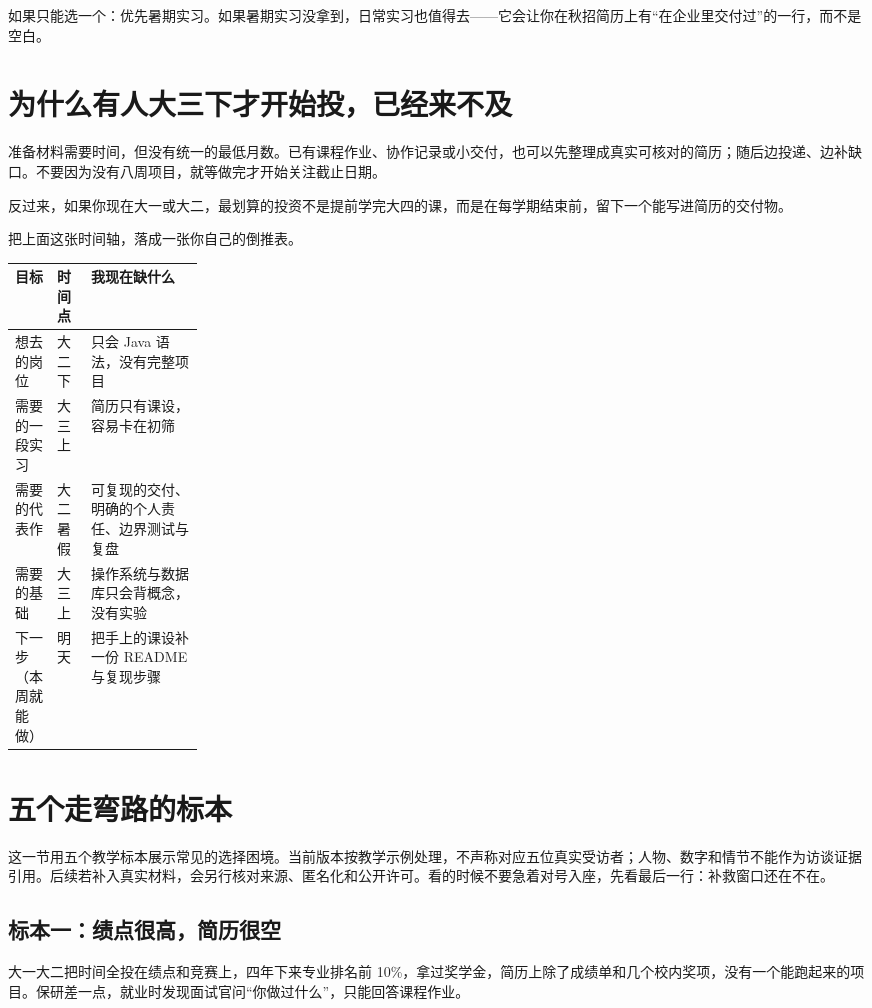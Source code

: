 \documentclass[UTF8,zihao=5,openany]{ctexbook}
\begin{document}
如果只能选一个：优先暑期实习。如果暑期实习没拿到，日常实习也值得去——它会让你在秋招简历上有“在企业里交付过”的一行，而不是空白。

\section{为什么有人大三下才开始投，已经来不及}
准备材料需要时间，但没有统一的最低月数。已有课程作业、协作记录或小交付，也可以先整理成真实可核对的简历；随后边投递、边补缺口。不要因为没有八周项目，就等做完才开始关注截止日期。

反过来，如果你现在大一或大二，最划算的投资不是提前学完大四的课，而是在每学期结束前，留下一个能写进简历的交付物。

把上面这张时间轴，落成一张你自己的倒推表。
\begin{toolbox}
\begin{center}\small
\begin{tabularx}{0.92\linewidth}{p{0.22\linewidth}YY}
\toprule
目标 & 时间点 & 我现在缺什么 \\
\midrule
想去的岗位 & 大二下 & 只会 Java 语法，没有完整项目 \\
需要的一段实习 & 大三上 & 简历只有课设，容易卡在初筛 \\
需要的代表作 & 大二暑假 & 可复现的交付、明确的个人责任、边界测试与复盘 \\
需要的基础 & 大三上 & 操作系统与数据库只会背概念，没有实验 \\
下一步（本周就能做） & 明天 & 把手上的课设补一份 README 与复现步骤 \\
\bottomrule
\end{tabularx}
\end{center}
\end{toolbox}


\section{五个走弯路的标本}
这一节用五个教学标本展示常见的选择困境。当前版本按教学示例处理，不声称对应五位真实受访者；人物、数字和情节不能作为访谈证据引用。后续若补入真实材料，会另行核对来源、匿名化和公开许可。看的时候不要急着对号入座，先看最后一行：补救窗口还在不在。

\subsection{标本一：绩点很高，简历很空}
大一大二把时间全投在绩点和竞赛上，四年下来专业排名前 10\%，拿过奖学金，简历上除了成绩单和几个校内奖项，没有一个能跑起来的项目。保研差一点，就业时发现面试官问“你做过什么”，只能回答课程作业。
\end{document}
